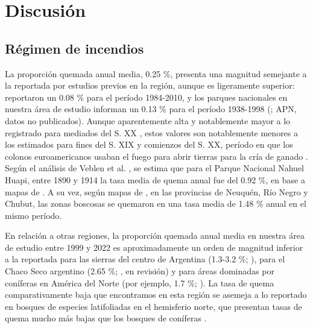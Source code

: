 \FloatBarrier

\section{Discusión}

\subsection{Régimen de incendios}

La proporción quemada anual media, 0.25 \%, presenta una magnitud semejante a la reportada por estudios previos en la región, aunque es ligeramente superior: \citet{paritsis_habitat_2013} reportaron un 0.08 \% para el período 1984-2010, y los parques nacionales en nuestra área de estudio informan un 0.13 \% para el período 1938-1998 (\citealt{bruno_incendios_1982}; APN, datos no publicados). Aunque aparentemente alta y notablemente mayor a lo registrado para mediados del S. XX \citep{Gowda2012}, estos valores son notablemente menores a los estimados para fines del S. XIX y comienzos del S. XX, período en que los colonos euroamericanos usaban el fuego para abrir tierras para la cría de ganado \citep{veblen_historical_2008}. Según el análisis de Veblen et al. \citealt{veblen_historical_2008}, se estima que para el Parque Nacional Nahuel Huapi, entre 1890 y 1914 la tasa media de quema anual fue del 0.92 \%, en base a mapas de \citet{Willis1914}. A su vez, según mapas de \citet{Rothkugel1916}, en las provincias de Neuquén, Río Negro y Chubut, las zonas boscosas se quemaron en una tasa media de 1.48 \% anual en el mismo período. 

En relación a otras regiones, la proporción quemada anual media en nuestra área de estudio entre 1999 y 2022 es aproximadamente un orden de magnitud inferior a la reportada para las sierras del centro de Argentina (1.3-3.2 \%; \citealt{arganaraz_incidencia_2020}), para el Chaco Seco argentino (2.65 \%; \citeauthor{FerroChaco}, en revisión) y para áreas dominadas por coníferas en América del Norte (por ejemplo, 1.7 \%; \citealt{riddle2023wildfire}). La tasa de quema comparativamente baja que encontramos en esta región se asemeja a lo reportado en bosques de especies latifoliadas en el hemisferio norte, que presentan tasas de quema mucho más bajas que los bosques de coníferas \citep{marchal_turning_2020, foster_bottom-up_2022}.

